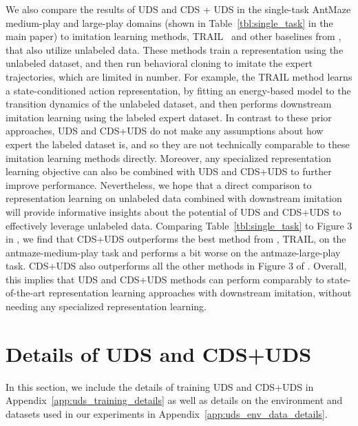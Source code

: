We also compare the results of UDS and CDS + UDS in the single-task AntMaze medium-play and large-play domains (shown in  Table~\ref{tbl:single_task} in the main paper) to imitation learning methods, TRAIL~\citep{yang2021trail} and other baselines from \citet{yang2021trail}, that also utilize unlabeled data. These methods train a representation using the unlabeled dataset, and then run behavioral cloning to imitate the expert trajectories, which are limited in number. For example, the TRAIL method learns a state-conditioned action representation, by fitting an energy-based model to the transition dynamics of the unlabeled dataset, and then performs downstream imitation learning using the labeled expert dataset. In contrast to these prior approaches, UDS and CDS+UDS do not make any assumptions about how expert the labeled dataset is, and so they are not technically comparable to these imitation learning methods directly. Moreover, any specialized representation learning objective can also be combined with UDS and CDS+UDS to further improve performance. Nevertheless, we hope that a direct comparison to representation learning on unlabeled data combined with downstream imitation will provide informative insights about the potential of UDS and CDS+UDS to effectively leverage unlabeled data. Comparing Table~\ref{tbl:single_task} to Figure 3 in \citet{yang2021trail}, we find that CDS+UDS outperforms the best method from \citet{yang2021trail}, TRAIL, on the antmaze-medium-play task and performs a bit worse on the antmaze-large-play task. CDS+UDS also outperforms all the other methods in Figure 3 of \cite{yang2021trail}. Overall, this implies that UDS and CDS+UDS methods can perform comparably to state-of-the-art representation learning approaches with downstream imitation, without needing any specialized representation learning.

\section{Details of UDS and CDS+UDS}
\label{app:uds_details}

In this section, we include the details of training UDS and CDS+UDS in  Appendix~\ref{app:uds_training_details} as well as details on the environment and datasets used in our experiments in Appendix~\ref{app:uds_env_data_details}. 

